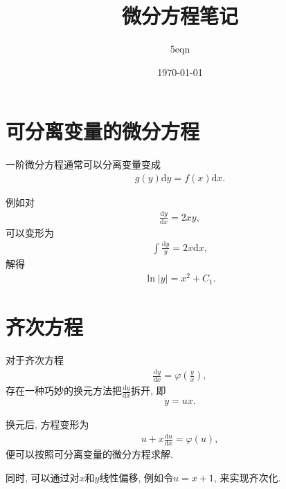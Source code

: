 \documentclass[UTF8,a4paper,11pt]{ctexart}
\title{微分方程笔记}
\author{5eqn}
\date{\today}
\begin{document}
  \maketitle
  \section{可分离变量的微分方程}
    一阶微分方程通常可以分离变量变成
    \[
    \begin{aligned}
    g\left(y\right)\mathrm{d}y=f\left(x\right)\mathrm{d}x.
    \end{aligned}
    \]
    
    例如对
    \[
    \begin{aligned}
      \frac{\mathrm{d}y}{\mathrm{d}x}=2xy,
    \end{aligned}
    \]
    可以变形为
    \[
    \begin{aligned}
      \int \frac{\mathrm{d}y}{y}=2x \mathrm{d}x,
    \end{aligned}
    \]
    解得
    \[
    \begin{aligned}
      \ln \left| y \right|=x^{2}+C_1.
    \end{aligned}
    \]
  \section{齐次方程}
    对于齐次方程
    \[
    \begin{aligned}
      \frac{\mathrm{d}y}{\mathrm{d}x}=\varphi\left(\frac{y}{x}\right),
    \end{aligned}
    \]
    存在一种巧妙的换元方法把$\frac{\mathrm{d}y}{\mathrm{d}x}$拆开, 即
    \[
    \begin{aligned}
      y=ux.
    \end{aligned}
    \]
    
    换元后, 方程变形为
    \[
    \begin{aligned}
      u+x \frac{\mathrm{d}u}{\mathrm{d}x}=\varphi\left(u\right),
    \end{aligned}
    \]
    便可以按照可分离变量的微分方程求解.

    同时, 可以通过对$x$和$y$线性偏移, 例如令$u=x+1$, 来实现齐次化.
\end{document}
